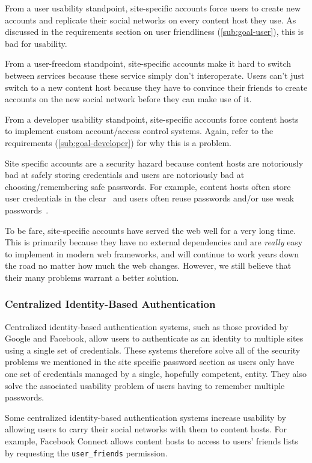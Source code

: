 \documentclass[pdftex,12pt,a4papaer,twoside,notitlepage]{report}
\begin{document}
From a user usability standpoint, site-specific accounts force users to create
new accounts and replicate their social networks on every content host they use.
As discussed in the requirements section on user friendliness (\cref{sub:goal-user}), this is bad for usability.

From a user-freedom standpoint, site-specific accounts make it hard to switch
between services because these service simply don't interoperate. Users can't
just switch to a new content host because they have to convince their friends to
create accounts on the new social network before they can make use of it.

From a developer usability standpoint, site-specific accounts force content
hosts to implement custom account/access control systems. Again, refer to the
requirements (\cref{sub:goal-developer}) for why this is a problem.

Site specific accounts are a security hazard because content hosts are
notoriously bad at safely storing credentials and users are notoriously bad at
choosing/remembering safe passwords. For example, content hosts often store user
credentials in the clear~\cite{plaintext} and users often reuse passwords and/or
use weak passwords~\cite{ms-passwords}.

To be fare, site-specific accounts have served the web well for a very long
time. This is primarily because they have no external dependencies and are
\emph{really} easy to implement in modern web frameworks, and will continue to
work years down the road no matter how much the web changes. However, we still
believe that their many problems warrant a better solution.

\subsubsection{Centralized Identity-Based Authentication}

Centralized identity-based authentication systems, such as those provided by
Google and Facebook, allow users to authenticate as an identity to multiple
sites using a single set of credentials. These systems therefore solve all of
the security problems we mentioned in the site specific password section as
users only have one set of credentials managed by a single, hopefully competent,
entity. They also solve the associated usability problem of users having to
remember multiple passwords.

Some centralized identity-based authentication systems increase usability by
allowing users to carry their social networks with them to content hosts. For
example, Facebook Connect allows content hosts to access to users' friends lists
by requesting the \verb=user_friends=
permission\cite{facebook-connect-user-friends}.
\end{document}
